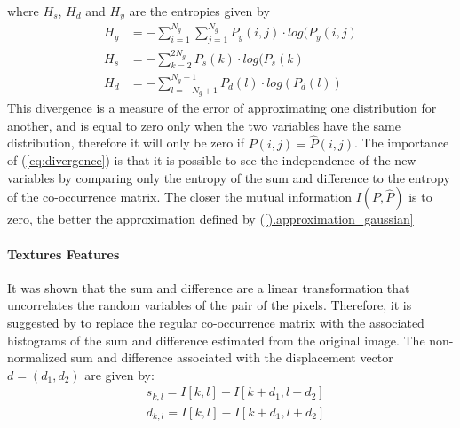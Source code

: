 where $H_s$, $H_d$ and $H_y$ are the entropies given by
\begin{equation}
\begin{split}
H_y &= -\sum_{i=1}^{N_g}\sum_{j=1}^{N_g}P_y(i,j)\cdot log(P_y(i,j)\\
H_s &= -\sum_{k=2}^{2N_g}P_s(k)\cdot log(P_s(k)\\
H_d &= -\sum_{l=-N_g+1}^{N_g-1}P_d(l)\cdot log(P_d(l))
\end{split}
\end{equation}
This divergence is a measure of the error of approximating one distribution for another, and is equal to zero only when the two variables have the same distribution, therefore it will only be zero if $P(i,j)=\hat{P}(i,j)$. The importance of (\ref{eq:divergence}) is that it is possible to see the independence of the new variables by comparing only the entropy of the sum and difference to the entropy of the co-occurrence matrix. The closer the mutual information $I(P, \hat{P})$ is to zero, the better the approximation defined by (\ref{).approximation_gaussian}

\paragraph{Textures Features}
It was shown that the sum and difference are a linear transformation that uncorrelates the random variables of the pair of the pixels. Therefore, it is suggested by \cite{Unser} to replace the regular co-occurrence matrix with the associated histograms of the sum and difference estimated from the original image.
The non-normalized sum and difference associated with the displacement vector $d=(d_1,d_2)$ are given by:
\begin{equation}
\begin{split}
&s_{k,l} = I[k,l] + I[k+d_1, l+d_2]\\
&d_{k,l} = I[k,l] - I[k+d_1, l+d_2]
\end{split}
\end{equation}

